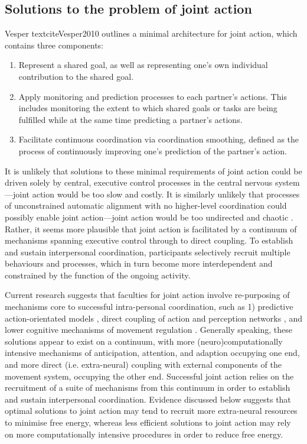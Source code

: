 \begin{CJK}{UTF8}{gbsn}
\subsection{Solutions to the problem of joint action\label{sect:solutionsJA}}

Vesper textcite{Vesper2010} outlines a minimal architecture for joint action, which contains three components:

\begin{enumerate}
  \item Represent a shared goal, as well as representing one’s own individual contribution to the shared goal.
  \item Apply monitoring and prediction processes to each partner’s actions. This includes monitoring the extent to which shared goals or tasks are being fulfilled while at the same time predicting a partner’s actions.
  \item Facilitate continuous coordination via coordination smoothing, defined as the process of continuously improving one’s prediction of the partner’s action.
\end{enumerate}

It is unlikely that solutions to these minimal requirements of joint action could be driven solely by central, executive control processes in the central nervous system---joint action would be too slow and costly. It is similarly unlikely that processes of unconstrained automatic alignment with no higher-level coordination could possibly enable joint action---joint action would be too undirected and chaotic \citep{Fusaroli2014}.  Rather, it seems more plausible that joint action is facilitated by a continuum of mechanisms spanning executive control through to direct coupling.  To establish and sustain interpersonal coordination, participants selectively recruit multiple behaviours and processes, which in turn become more interdependent and constrained by the function of the ongoing activity.

Current research suggests that faculties for joint action involve re-purposing of mechanisms core to successful intra-personal coordination, such as 1) predictive action-orientated models \citep{Vesper2012}, direct coupling of action and perception networks \citep{Novembre2014}, and lower cognitive mechanisms of movement regulation \citep{Semin2008,Riley2011}.  Generally speaking, these solutions appear to exist on a continuum, with more (neuro)computationally intensive mechanisms of anticipation, attention, and adaption occupying one end, and more direct (i.e. extra-neural) coupling with external components of the movement system, occupying the other end.  Successful joint action relies on the recruitment of a suite of mechanisms from this continuum in order to establish and sustain interpersonal coordination.  Evidence discussed below suggests that optimal solutions to joint action may tend to recruit more extra-neural resources to minimise free energy, whereas less efficient solutions to joint action may rely on more computationally intensive procedures in order to reduce free energy.


\end{CJK}
